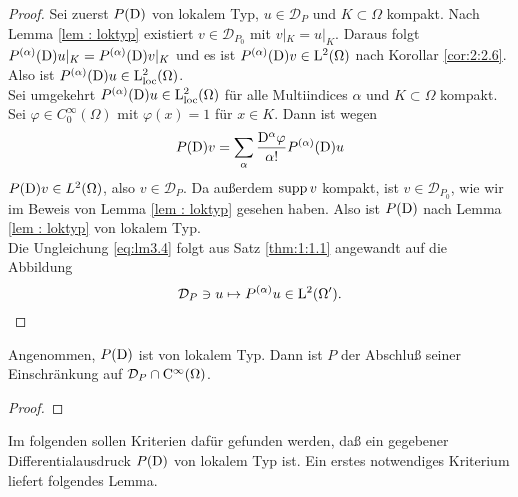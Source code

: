 \begin{proof}
Sei zuerst $P(\mathrm D)$ von lokalem Typ, $u\in\mathcal{D}_P$ und $K\subset\Omega$ kompakt. Nach Lemma \ref{lem : loktyp} existiert $v\in\mathcal{D}_{P_0}$ mit $v|_K=u|_K$. Daraus folgt $P^{(\alpha)}(\mathrm D)u|_K=P^{(\alpha)}(\mathrm D)v|_K$ und es ist $P^{(\alpha)}(\mathrm D)v\in\mathrm L^2(\Omega)$ nach Korollar \ref{cor:2:2.6}. Also ist $P^{(\alpha)}(\mathrm D)u \in \mathrm L^2_{\text{loc}}(\Omega)$.\\
Sei umgekehrt $P^{(\alpha)}(\mathrm D)u \in \mathrm L^2_{\text{loc}}(\Omega)$ für alle Multiindices $\alpha$ und $K\subset\Omega$ kompakt. Sei $\varphi\in C_0^\infty(\Omega)$ mit $\varphi(x)=1$ für $x\in K$. Dann ist wegen
\begin{equation}
P(\mathrm D)v=\sum_\alpha \dfrac{\mathrm D^\alpha \varphi}{{\alpha}!}P^{(\alpha)}(\mathrm D)u
\end{equation}
$P(\mathrm D)v\in L^2(\Omega)$, also $v\in\mathcal{D}_P$. Da außerdem $\operatorname{supp} v$ kompakt, ist $v\in \mathcal{D}_{P_0}$, wie wir im Beweis von Lemma \ref{lem : loktyp} gesehen haben. Also ist $P(\mathrm D)$ nach Lemma \ref{lem : loktyp} von lokalem Typ.\\
Die Ungleichung \ref{eq:lm3.4} folgt aus Satz \ref{thm:1:1.1} angewandt auf die Abbildung
\begin{equation}
\mathcal{D}_P \ni u \mapsto P^{(\alpha)}u\in \mathrm L^2(\Omega').
\end{equation}
\end{proof}

%
%
%

\begin{thm}
   Angenommen, $P(\mathrm D)$ ist von lokalem Typ. Dann ist $P$ der Abschluß seiner Einschränkung auf $\mathcal D_P\cap \mathrm C^\infty(\Omega)$.
\end{thm}
\begin{proof}

\end{proof}

%
%

Im folgenden sollen Kriterien dafür gefunden werden, daß ein gegebener Differentialausdruck $P(\mathrm D)$ von lokalem Typ ist. Ein erstes notwendiges Kriterium liefert folgendes Lemma.

